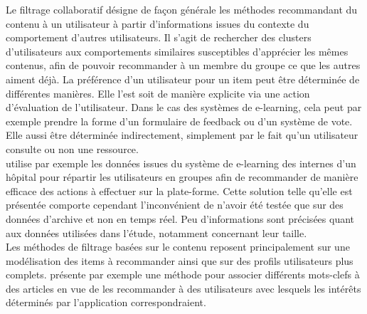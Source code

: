 \documentclass[conference]{./sty/IEEEtran}
\begin{document}
Le filtrage collaboratif désigne de façon générale les méthodes recommandant du
contenu à un utilisateur à partir d'informations issues du contexte du
comportement d'autres utilisateurs. Il s'agit de rechercher des clusters
d'utilisateurs aux comportements similaires susceptibles d'apprécier les mêmes
contenus, afin de pouvoir recommander à un membre du groupe ce que les autres
aiment déjà. La préférence d'un utilisateur pour un item peut être déterminée
de différentes manières. Elle l'est soit de manière explicite via une action 
d'évaluation de l'utilisateur. Dans le cas des systèmes de e-learning, cela
peut par exemple prendre la forme d'un formulaire de feedback ou d'un système
de vote. Elle aussi être déterminée indirectement, simplement par le fait qu'un
utilisateur consulte ou non une ressource. \\
\cite{Liou:2014:CPL:2617848.2617854} utilise par exemple les données issues du
système de  e-learning des internes d'un hôpital pour répartir les utilisateurs
en groupes afin de recommander de manière efficace des actions à effectuer sur
la plate-forme. Cette solution telle qu'elle est présentée comporte cependant
l'inconvénient de n'avoir été testée que sur des données d'archive et non en
temps réel. Peu d'informations sont précisées quant aux données utilisées dans
l'étude, notamment concernant leur taille.  \\

Les méthodes de filtrage basées sur le contenu reposent principalement sur
une modélisation des items à recommander ainsi que sur des profils utilisateurs
plus complets. \cite{DBLP:journals/jucs/SternKHKL10} présente par exemple une
méthode pour associer différents mots-clefs à des articles en vue de les
recommander à des utilisateurs avec lesquels les intérêts déterminés par
l'application correspondraient. \\
\end{document}
